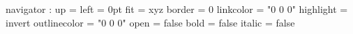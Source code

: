 {\ifpdforluatex

\def\nav@embeddedfile_setnames{%
  \pdfnames{/EmbeddedFiles \pdfrefobject{EmbeddedFiles}}%
  }

\else

\def\nav@embeddedfile_setnames{%
  \special{pdf: put @names << /EmbeddedFiles \pdfrefobject{EmbeddedFiles} >>}%
  }

\fi


\newif\ifnav@finished
\def\finishpdffile{%
  \unless\ifnav@finished
    \global\nav@finishedtrue
    \nav@embeddedfile_process
    \nav@processoutlines
    \nav@processinfo
  \fi
  }

\setparameter navigator :
  up    = \baselineskip
  left  = 0pt
  fit   = xyz
%
  border    = 0
  linkcolor = "0 0 0" %
  highlight = invert
%
  outlinecolor = "0 0 0" %
  open         = false
  bold         = false
  italic       = false
%
%


\def\nav@processinfo_do#1#2{%
  \nav@passvalueand{/#1 (\pdfstring}navigator:#2;{) }{}%
  }

}

